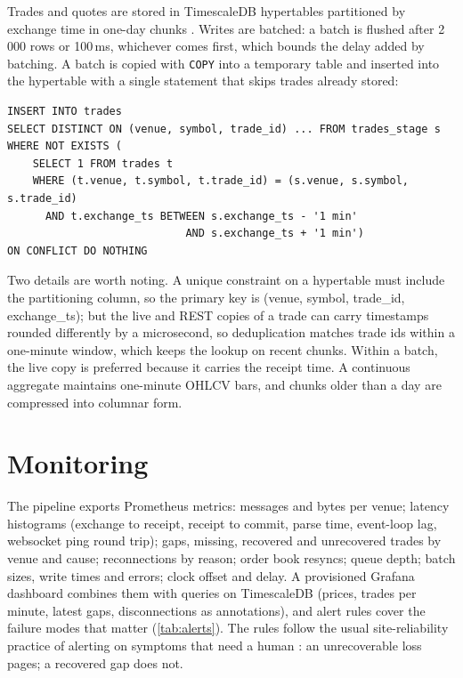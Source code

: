 \documentclass[11pt,a4paper]{article}
\newcommand{\code}[1]{\texttt{#1}}
\newcommand{\ms}{\,ms}
\begin{document}
Trades and quotes are stored in TimescaleDB hypertables partitioned by exchange time in one-day chunks
\citep{timescale}. Writes are batched: a batch is flushed after 2\,000 rows or 100\ms, whichever comes first,
which bounds the delay added by batching. A batch is copied with \code{COPY} into a temporary table and inserted
into the hypertable with a single statement that skips trades already stored:
\begin{verbatim}
INSERT INTO trades
SELECT DISTINCT ON (venue, symbol, trade_id) ... FROM trades_stage s
WHERE NOT EXISTS (
    SELECT 1 FROM trades t
    WHERE (t.venue, t.symbol, t.trade_id) = (s.venue, s.symbol, s.trade_id)
      AND t.exchange_ts BETWEEN s.exchange_ts - '1 min'
                            AND s.exchange_ts + '1 min')
ON CONFLICT DO NOTHING
\end{verbatim}
Two details are worth noting. A unique constraint on a hypertable must include the partitioning column, so the
primary key is (venue, symbol, trade\_id, exchange\_ts); but the live and REST copies of a trade can carry
timestamps rounded differently by a microsecond, so deduplication matches trade ids within a one-minute window,
which keeps the lookup on recent chunks. Within a batch, the live copy is preferred because it carries the
receipt time. A continuous aggregate maintains one-minute OHLCV bars, and chunks older than a day are compressed
into columnar form.

\section{Monitoring}\label{sec:monitoring}

The pipeline exports Prometheus metrics: messages and bytes per venue; latency histograms (exchange to receipt,
receipt to commit, parse time, event-loop lag, websocket ping round trip); gaps, missing, recovered and
unrecovered trades by venue and cause; reconnections by reason; order book resyncs; queue depth; batch sizes,
write times and errors; clock offset and delay. A provisioned Grafana dashboard combines them with queries on
TimescaleDB (prices, trades per minute, latest gaps, disconnections as annotations), and alert rules cover the
failure modes that matter (\cref{tab:alerts}). The rules follow the usual site-reliability practice of alerting
on symptoms that need a human \citep{beyer2016}: an unrecoverable loss pages; a recovered gap does not.
\end{document}
